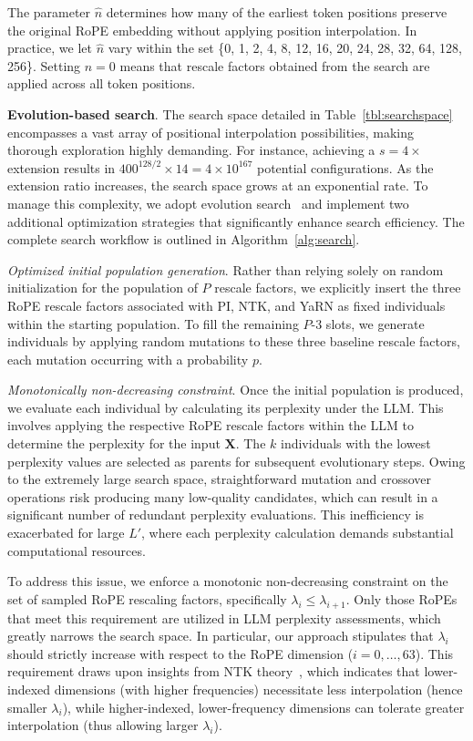 The parameter $\hat{n}$ determines how many of the earliest token positions preserve the original RoPE embedding without applying position interpolation. In practice, we let $\hat{n}$ vary within the set \{0, 1, 2, 4, 8, 12, 16, 20, 24, 28, 32, 64, 128, 256\}. Setting $\hat{n}=0$ means that rescale factors obtained from the search are applied across all token positions.

\textbf{Evolution-based search}. The search space detailed in Table~\ref{tbl:searchspace} encompasses a vast array of positional interpolation possibilities, making thorough exploration highly demanding. For instance, achieving a $s=4\times$ extension results in $400^{128/2}\times14 = 4\times10^{167}$ potential configurations. As the extension ratio increases, the search space grows at an exponential rate. To manage this complexity, we adopt evolution search~\cite{guo2020single} and implement two additional optimization strategies that significantly enhance search efficiency. The complete search workflow is outlined in Algorithm~\ref{alg:search}.

\textit{Optimized initial population generation}. Rather than relying solely on random initialization for the population of $P$ rescale factors, we explicitly insert the three RoPE rescale factors associated with PI, NTK, and YaRN as fixed individuals within the starting population. To fill the remaining $P$-3 slots, we generate individuals by applying random mutations to these three baseline rescale factors, each mutation occurring with a probability $p$.

\textit{Monotonically non-decreasing constraint}. Once the initial population is produced, we evaluate each individual by calculating its perplexity under the LLM. This involves applying the respective RoPE rescale factors within the LLM to determine the perplexity for the input $\mathbf{X}$. The $k$ individuals with the lowest perplexity values are selected as parents for subsequent evolutionary steps. Owing to the extremely large search space, straightforward mutation and crossover operations risk producing many low-quality candidates, which can result in a significant number of redundant perplexity evaluations. This inefficiency is exacerbated for large $L'$, where each perplexity calculation demands substantial computational resources.

To address this issue, we enforce a monotonic non-decreasing constraint on the set of sampled RoPE rescaling factors, specifically $\lambda_i \le \lambda_{i+1}$. Only those RoPEs that meet this requirement are utilized in LLM perplexity assessments, which greatly narrows the search space. In particular, our approach stipulates that $\lambda_i$ should strictly increase with respect to the RoPE dimension ($i=0,\ldots,63$). This requirement draws upon insights from NTK theory~\cite{jacot2018neural,tancik2020fourier,ntk}, which indicates that lower-indexed dimensions (with higher frequencies) necessitate less interpolation (hence smaller $\lambda_i$), while higher-indexed, lower-frequency dimensions can tolerate greater interpolation (thus allowing larger $\lambda_i$).

